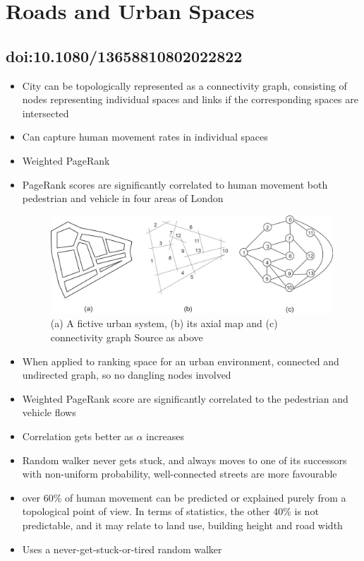 \documentclass[11pt]{report}
\begin{document}
\section{Roads and Urban Spaces}
\subsection{doi:10.1080/13658810802022822}
\begin{itemize}
\item City can be topologically represented as a connectivity graph, consisting of nodes representing individual spaces and links if the corresponding spaces are intersected
\item Can capture human movement rates in individual spaces
\item Weighted PageRank
\item PageRank scores are significantly correlated to human movement both pedestrian and vehicle in four areas of London
\begin{figure}
\includegraphics[width=\linewidth]{map_view.jpeg}
\caption{(a) A fictive urban system, (b) its axial map and (c) connectivity graph Source as above}
\label{fig:map}
\end{figure}
\item When applied to ranking space for an urban environment, connected and undirected graph, so no dangling nodes involved
\item Weighted PageRank score are significantly correlated to the pedestrian and vehicle flows
\item Correlation gets better as $\alpha$ increases
\item Random walker never gets stuck, and always moves to one of its successors with non-uniform probability, well-connected streets are more favourable
\item over 60\% of human movement can be predicted or explained purely from a topological point of view. In terms of statistics, the other 40\% is not predictable, and it may relate to land use, building height and road width
\item Uses a never-get-stuck-or-tired random walker
\end{itemize}
\end{document}
